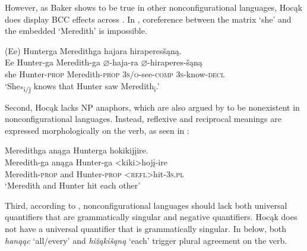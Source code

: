 \documentclass[output=paper]{LSP/langsci}
\begin{document}
However, as Baker shows to be true in other nonconfigurational languages, Hocąk does display BCC effects across . In , coreference between the matrix  `she' and the embedded  `Meredith' is impossible.
 
\begin{exe}
\ex\label{ex:jrs:17}	
\glll (Ee) 	Hunterga 	Meredithga		hajara 						hiraperes\v{s}ąną. \\
 Ee 		Hunter-ga 	Meredith-ga 		$\varnothing$-haja-ra 				$\varnothing$-hiraperes-\v{s}ąną \\
she 		Hunter-\textsc{prop} 	Meredith-\textsc{prop} 	\textsc{3s/o}-see-\textsc{comp} 	\textsc{3s}-know-\textsc{decl}  \\
\trans `She\textsubscript{*i/j} knows that Hunter saw Meredith\textsubscript{i}.'
\end{exe}	

 
Second, Hocąk lacks NP anaphors, which are also argued by \citet{Baker1996} to be nonexistent in nonconfigurational languages. Instead, reflexive and reciprocal meanings are expressed morphologically on the verb, as seen in :
 
\begin{exe}
\ex\label{ex:jrs:18} 
\glll Meredithga		anąga 	Hunterga 			hokikij\k{i}ire.\\
Meredith-ga	 	anąga 	Hunter-ga 			<kiki>hoj\k{i}-ire \\
Meredith-\textsc{prop} and 		Hunter-\textsc{prop} 	<\textsc{refl}>hit-\textsc{3s.pl} \\
\trans `Meredith and Hunter hit each other'
\end{exe}
	
 
Third, according to \citet{Baker1996}, nonconfigurational languages should lack both universal quantifiers that are grammatically singular and negative quantifiers. Hocąk does not have a universal quantifier that is grammatically singular.  In  below, both \textit{hanąąc} `all/every' and \textit{hi\v{z}ąki\v{s}ąną} `each' trigger plural agreement on the verb.
 
\end{document}
